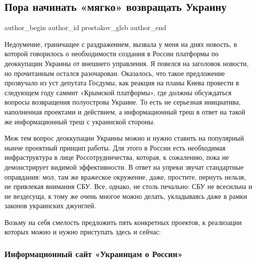 
 
 
 
 
 
\subsection{Пора начинать «мягко» возвращать Украину}
\label{sec:19_11_2020.news.ru.vz.prostakov_gleb.1.mjagko_vozvraschat_ukrainu}
\ifcmt
	author_begin
   author_id prostakov_gleb
	author_end
\fi

Недоумение, граничащее с раздражением, вызвала у меня на днях новость, в
которой говорилось о необходимости создания в России платформы по деоккупации
Украины от внешнего управления. Я повелся на заголовок новости, но прочитанным
остался разочарован. Оказалось, что такое предложение прозвучало из уст
депутата Госдумы, как реакция на планы Киева провести в следующем году саммит
«Крымской платформы», где должны обсуждаться вопросы возвращения полуострова
Украине. То есть не серьезная инициатива, наполненная проектами и действием, а
информационный треш в ответ на такой же информационный треш с украинской
стороны.

Меж тем вопрос деоккупации Украины можно и нужно ставить на популярный нынче
проектный принцип работы. Для этого в России есть необходимая инфраструктура в
лице Россотрудничества, которая, к сожалению, пока не демонстрирует видимой
эффективности. В ответ на упреки звучат стандартные оправдания: мол, там же
вражеское окружение, даже, простите, пернуть нельзя, не привлекая внимания СБУ.
Все, однако, не столь печально: СБУ не всесильна и не вездесуща, к тому же
очень многое можно делать, укладываясь даже в рамки законов украинских
джунглей.

Возьму на себя смелость предложить пять конкретных проектов, к реализации
которых можно и нужно приступать здесь и сейчас: 

\subsubsection{Информационный сайт «Украинцам о России»}

